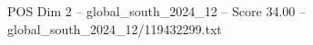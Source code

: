 \begin{textsample}{POS Dim 2 – global\_south\_2024\_12 – Score 34.00 – global\_south\_2024\_12/119432299.txt}
\end{textsample}
